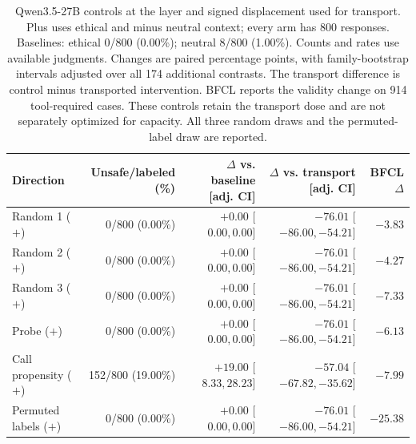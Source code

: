 \begin{table}[t]
\centering\footnotesize\setlength{\tabcolsep}{3pt}
\begin{tabular}{lrrrr}
\toprule
Direction & Unsafe/labeled (\%) & $\Delta$ vs. baseline [adj. CI] & $\Delta$ vs. transport [adj. CI] & BFCL $\Delta$ \\
\midrule
Random 1 ($+$) & 0/800 (0.00\%) & $+0.00$ [$ 0.00, 0.00 $] & $-76.01$ [$ -86.00, -54.21 $] & $-3.83$ \\
Random 2 ($+$) & 0/800 (0.00\%) & $+0.00$ [$ 0.00, 0.00 $] & $-76.01$ [$ -86.00, -54.21 $] & $-4.27$ \\
Random 3 ($+$) & 0/800 (0.00\%) & $+0.00$ [$ 0.00, 0.00 $] & $-76.01$ [$ -86.00, -54.21 $] & $-7.33$ \\
Probe ($+$) & 0/800 (0.00\%) & $+0.00$ [$ 0.00, 0.00 $] & $-76.01$ [$ -86.00, -54.21 $] & $-6.13$ \\
Call propensity ($+$) & 152/800 (19.00\%) & $+19.00$ [$ 8.33, 28.23 $] & $-57.04$ [$ -67.82, -35.62 $] & $-7.99$ \\
Permuted labels ($+$) & 0/800 (0.00\%) & $+0.00$ [$ 0.00, 0.00 $] & $-76.01$ [$ -86.00, -54.21 $] & $-25.38$ \\
\bottomrule
\end{tabular}
\caption{Qwen3.5-27B controls at the layer and signed displacement used for transport. Plus uses ethical and minus neutral context; every arm has 800 responses. Baselines: ethical 0/800 (0.00\%); neutral 8/800 (1.00\%). Counts and rates use available judgments. Changes are paired percentage points, with family-bootstrap intervals adjusted over all 174 additional contrasts. The transport difference is control minus transported intervention. BFCL reports the validity change on 914 tool-required cases. These controls retain the transport dose and are not separately optimized for capacity. All three random draws and the permuted-label draw are reported.}
\label{tab:controls-receiver_m1}
\end{table}
